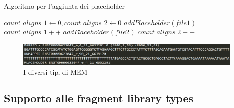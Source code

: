 \begin{algorithm}
\caption{Algoritmo per l'aggiunta dei placeholder}\label{placeholder}
\begin{algorithmic}[1]
	\State $count\_aligns\_1 \gets 0, count\_aligns\_2 \gets 0$
			\State $addPlaceholder(file1)$
			\State $count\_aligns\_1++$
		\Else
			\State $addPlaceholder(file2)$
			\State $count\_aligns\_2++$
		\EndIf
	\EndWhile\label{euclidendwhile}
\end{algorithmic}
\end{algorithm}

\begin{figure}[h]
	\centering
	\includegraphics[width=\linewidth]{images/tipiMEM2.png}
  \caption{I diversi tipi di MEM}
  \label{fig:AlternativeSplicingTypes}
\end{figure}

\subsection{Supporto alle fragment library types}


